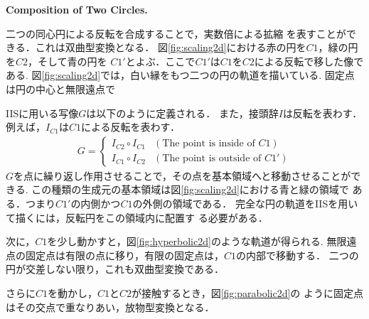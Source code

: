 \noindent\textbf{Composition of Two Circles.}

二つの同心円による反転を合成することで，実数倍による拡縮
を表すことができる．これは双曲型変換となる．
図\ref{fig:scaling2d}における赤の円を$C1$，緑の円を$C2$，そして青の円を
$C1'$とよぶ．ここで$C1'$は$C1$を$C2$による反転で移した像である.
図\ref{fig:scaling2d}では，白い縁をもつ二つの円の軌道を描いている.
固定点は円の中心と無限遠点で

IISに用いる写像$G$は以下のように定義される．
また，接頭辞$I$は反転を表わす．
例えば，$I_{C1}$は$C1$による反転を表わす．
\begin{align*}
 G =
  \begin{cases}
   I_{C2} \circ I_{C1} & (\text{The point is inside of } C1) \\
   I_{C1} \circ I_{C2} & (\text{The point is outside of } C1')
  \end{cases}
\end{align*}
$G$を点に繰り返し作用させることで，その点を基本領域へと移動させることができる.
この種類の生成元の基本領域は図\ref{fig:scaling2d}における青と緑の領域で
ある．つまり$C1'$の内側かつ$C1$の外側の領域である．
完全な円の軌道をIISを用いて描くには，反転円をこの領域内に配置す
る必要がある．

次に，$C1$を少し動かすと，図\ref{fig:hyperbolic2d}のような軌道が得られる.
無限遠点の固定点は有限の点に移り，有限の固定点は，$C1$の内部で移動する．
二つの円が交差しない限り，これも双曲型変換である．

さらに$C1$を動かし，$C1$と$C2$が接触するとき，図\ref{fig:parabolic2d}の
ように固定点はその交点で重なりあい，放物型変換となる．

